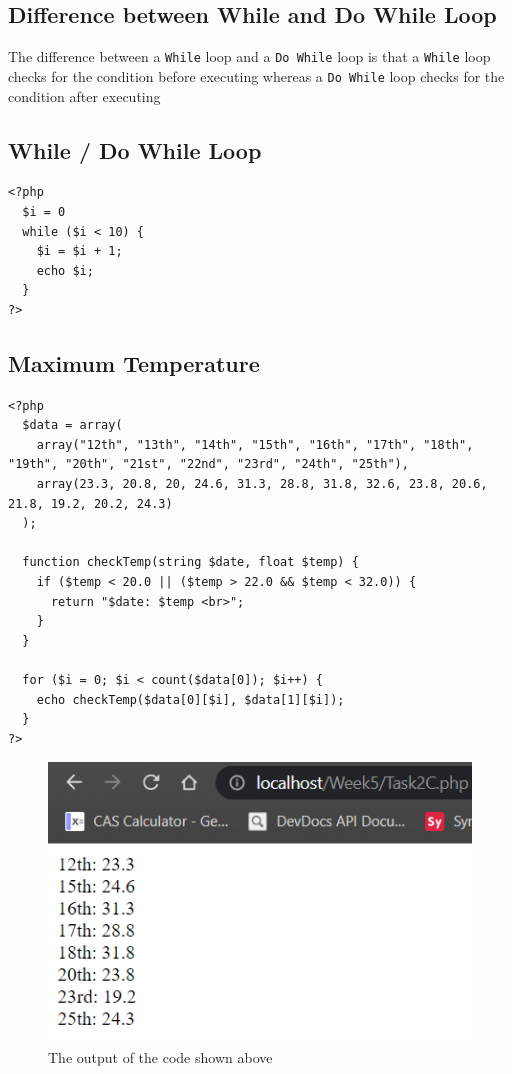 \documentclass{article}
\begin{document}
        \subsection{Difference between While and Do While Loop}
             The difference between a \verb|While| loop and a \verb|Do While| loop is that a \verb|While| loop checks for the condition before executing whereas a \verb|Do While| loop checks for the condition after executing
         \subsection{While / Do While Loop}
            \begin{verbatim}
<?php
  $i = 0
  while ($i < 10) {
    $i = $i + 1;
    echo $i;
  }
?>
            \end{verbatim}
        \subsection{Maximum Temperature}
            \begin{verbatim}
<?php
  $data = array(
    array("12th", "13th", "14th", "15th", "16th", "17th", "18th", "19th", "20th", "21st", "22nd", "23rd", "24th", "25th"),
    array(23.3, 20.8, 20, 24.6, 31.3, 28.8, 31.8, 32.6, 23.8, 20.6, 21.8, 19.2, 20.2, 24.3)
  );
  
  function checkTemp(string $date, float $temp) {
    if ($temp < 20.0 || ($temp > 22.0 && $temp < 32.0)) {
      return "$date: $temp <br>";
    }
  }
  
  for ($i = 0; $i < count($data[0]); $i++) {
    echo checkTemp($data[0][$i], $data[1][$i]);
  }
?>
            \end{verbatim}
            \begin{figure}[h]
                \centering
                \includegraphics[width=1.0\textwidth]{Task2COutput}
                \caption{The output of the code shown above}
            \end{figure}
\end{document}
